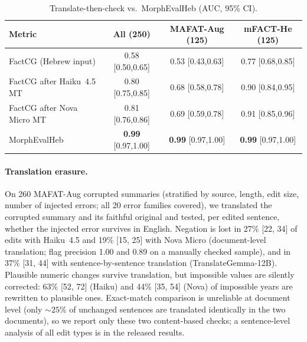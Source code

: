 \begin{table}[h]
\centering\small
\begin{tabular}{lccc}
\toprule
Metric & All (250) & MAFAT-Aug (125) & mFACT-He (125) \\
\midrule
FactCG (Hebrew input) & 0.58 {\scriptsize[0.50,0.65]} & 0.53 {\scriptsize[0.43,0.63]} & 0.77 {\scriptsize[0.68,0.85]} \\
FactCG after Haiku~4.5 MT & 0.80 {\scriptsize[0.75,0.85]} & 0.68 {\scriptsize[0.58,0.78]} & 0.90 {\scriptsize[0.84,0.95]} \\
FactCG after Nova Micro MT & 0.81 {\scriptsize[0.76,0.86]} & 0.69 {\scriptsize[0.59,0.78]} & 0.91 {\scriptsize[0.85,0.96]} \\
MorphEvalHeb & \textbf{0.99} {\scriptsize[0.97,1.00]} & \textbf{0.99} {\scriptsize[0.97,1.00]} & \textbf{0.99} {\scriptsize[0.97,1.00]} \\
\bottomrule
\end{tabular}
\caption{Translate-then-check vs.\ MorphEvalHeb (AUC, 95\% CI).}
\label{tab:translate_test}
\end{table}

\paragraph{Translation erasure.} On 260 MAFAT-Aug corrupted summaries (stratified by source, length, edit size, number of injected errors; all 20 error families covered), we translated the corrupted summary and its faithful original and tested, per edited sentence, whether the injected error survives in English.
Negation is lost in 27\% [22, 34] of edits with Haiku~4.5 and 19\% [15, 25] with Nova Micro (document-level translation; flag precision 1.00 and 0.89 on a manually checked sample), and in 37\% [31, 44] with sentence-by-sentence translation (TranslateGemma-12B).
Plausible numeric changes survive translation, but impossible values are silently corrected: 63\% [52, 72] (Haiku) and 44\% [35, 54] (Nova) of impossible years are rewritten to plausible ones.
Exact-match comparison is unreliable at document level (only ${\sim}25\%$ of unchanged sentences are translated identically in the two documents), so we report only these two content-based checks; a sentence-level analysis of all edit types is in the released results.
